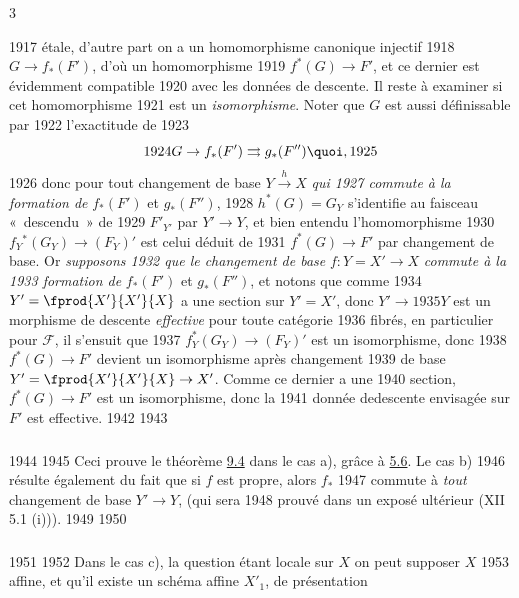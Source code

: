 3	\documentclass[10pt]{../fichiers-configuration-latex/smfart}
\begin{document}
  1917	étale, d'autre part on a un homomorphisme canonique injectif
  1918	$G\rightarrow f_{\ast}(F')$, d'où un homomorphisme
  1919	$f^{\ast}(G)\rightarrow F'$, et ce dernier est évidemment compatible
  1920	avec les données de descente. Il reste à examiner si cet homomorphisme
  1921	est un \emph{isomorphisme}. Noter que $G$ est aussi définissable par
  1922	l'exactitude de
  1923	$$
  1924	G\rightarrow f_{\ast}(F')\rightrightarrows g_{\ast}(F''){\quoi},
  1925	$$
  1926	donc pour tout changement de base $Y\xrightarrow{h}X$ \emph{qui
  1927	  commute à la formation de} $f_{\ast}(F')$ et $g_{\ast}(F'')$,
  1928	$h^{\ast}(G)=G_{Y}$ s'identifie au faisceau « descendu » de
  1929	$F'_{Y'}$ par $Y'\rightarrow Y$, et bien entendu l'homomorphisme
  1930	$f_{Y}{}^{\ast}(G_{Y})\rightarrow (F_{Y})'$ est celui déduit de
  1931	$f^{\ast}(G)\rightarrow F'$ par changement de base. Or \emph{supposons
  1932	  que le changement de base} $f:Y=X'\rightarrow X$ \emph{commute à la
  1933	  formation de} $f_{\ast}(F')$ et $g_{\ast}(F'')$, et notons que comme
  1934	$Y'=\fprod{X'}{X'}{X}$ a une section sur $Y'=X'$, donc $Y'\rightarrow
  1935	Y$ est un morphisme de descente \emph{effective} pour toute catégorie
  1936	fibrés, en particulier pour $\mathcal{F}$, il s'ensuit que
  1937	$f^{\ast}_{Y}(G_{Y})\rightarrow (F_{Y})'$ est un isomorphisme, donc
  1938	$f^{\ast}(G)\rightarrow F'$ devient un isomorphisme après changement
  1939	de base $Y'=\fprod{X'}{X'}{X}\rightarrow X'$. Comme ce dernier a une
  1940	section, $f^{\ast}(G)\rightarrow F'$ est un isomorphisme, donc la
  1941	donnée de\pageoriginale  descente envisagée sur $F'$ est effective.
  1942	
  1943	\subsubsection{}
  1944	
  1945	Ceci prouve le théorème \hyperref[VIII.thm9.4]{9.4} dans le cas a), grâce à \hyperref[VIII.cor5.6]{5.6}. Le cas b)
  1946	résulte également du fait que si $f$ est propre, alors $f_{\ast}$
  1947	commute à \emph{tout} changement de base $Y'\rightarrow Y$, (qui sera
  1948	prouvé dans un exposé ultérieur (XII 5.1 (i))).
  1949	
  1950	\subsubsection{}
  1951	
  1952	Dans le cas c), la question étant locale sur $X$ on peut supposer $X$
  1953	affine, et qu'il existe un schéma affine $X'_{1}$, de présentation
\end{document}
